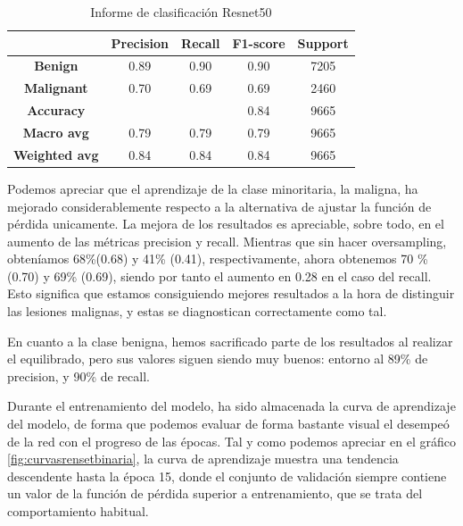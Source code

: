 \begin{table}[!ht]
	\centering
	\begin{tabular}{|c|c|c|c|c|}
		\hline
		\textbf{} & \textbf{Precision} & \textbf{Recall} & \textbf{F1-score} & \textbf{Support} \\ \hline
		\textbf{Benign} & 0.89 & 0.90 & 0.90 & 7205 \\ \hline
		\textbf{Malignant} & 0.70 & 0.69 & 0.69 & 2460 \\ \hline
		\textbf{Accuracy} & ~ & ~ & 0.84 & 9665 \\ \hline
		\textbf{Macro avg} & 0.79 & 0.79 & 0.79 & 9665 \\ \hline
		\textbf{Weighted avg} & 0.84 & 0.84 & 0.84 & 9665 \\ \hline
	\end{tabular}
	\caption{Informe de clasificación Resnet50}
	\label{tab:resultsbinrn50}
\end{table}


Podemos apreciar que el aprendizaje de la clase minoritaria, la maligna, ha mejorado considerablemente respecto a la alternativa de ajustar la función de pérdida unicamente. La mejora de los resultados es apreciable, sobre todo, en el aumento de las métricas precision y recall. Mientras que sin hacer oversampling, obteníamos 68\%(0.68) y 41\% (0.41), respectivamente, ahora obtenemos 70 \% (0.70) y 69\% (0.69), siendo por tanto el aumento en 0.28 en el caso del recall. Esto significa que estamos consiguiendo mejores resultados a la hora de distinguir las lesiones malignas, y estas se diagnostican correctamente como tal.

En cuanto a la clase benigna, hemos sacrificado parte de los resultados al realizar el equilibrado, pero sus valores siguen siendo muy buenos: entorno al 89\% de precision, y 90\% de recall.

Durante el entrenamiento del modelo, ha sido almacenada la curva de aprendizaje del modelo, de forma que podemos evaluar de forma bastante visual el desempeó de la red con el progreso de las  épocas.  Tal y como podemos apreciar en el gráfico \ref{fig:curvasrensetbinaria}, la curva de aprendizaje muestra una tendencia descendente hasta la época 15, donde el conjunto de validación siempre contiene un valor de la función de pérdida superior a entrenamiento, que se trata del comportamiento habitual.

